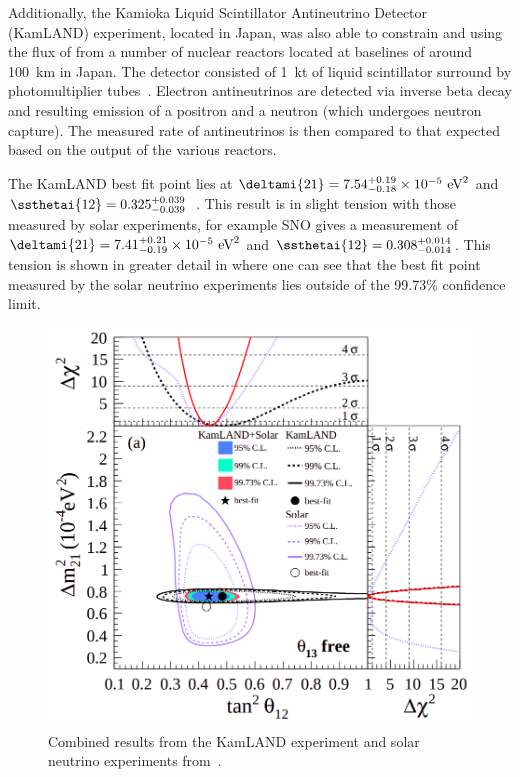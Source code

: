Additionally, the Kamioka Liquid Scintillator Antineutrino Detector (KamLAND) experiment, located in Japan, was also able to constrain  and  using the flux of \anue from a number of nuclear reactors located at baselines of around \SI{100}{\km} in Japan.
The detector consisted of \SI{1}{\kilo\tonne} of liquid scintillator surround by photomultiplier tubes~\cite{kamland}.
Electron antineutrinos are detected via inverse beta decay and resulting emission of a positron and a neutron (which undergoes neutron capture).
The measured rate of antineutrinos is then compared to that expected based on the output of the various reactors.

The KamLAND best fit point lies at $\deltami{21} = 7.54^{+0.19}_{-0.18} \times 10^{-5}~\text{eV}^{2}$ and $\ssthetai{12}=0.325^{+0.039}_{-0.039}$~\cite{kamland}.
This result is in slight tension with those measured by solar experiments, for example SNO gives a measurement of $\deltami{21}=7.41^{+0.21}_{-0.19} \times 10^{-5}~\text{eV}^{2}$ and $\ssthetai{12}=0.308^{+0.014}_{-0.014}$.
This tension is shown in greater detail in  where one can see that the best fit point measured by the solar neutrino experiments lies outside of the 99.73\% confidence limit.

\begin{figure}[h]
  \centering
  \includegraphics[width=.7\linewidth]{files/figures/theory/kamlandPlusSolar}
  \caption[Combined limits from the KamLAND experiment and solar neutrino experiments.]{Combined results from the KamLAND experiment and solar neutrino experiments from~\cite{kamland}.}
  \label{fig:kamlandPlusSolar}
\end{figure}

